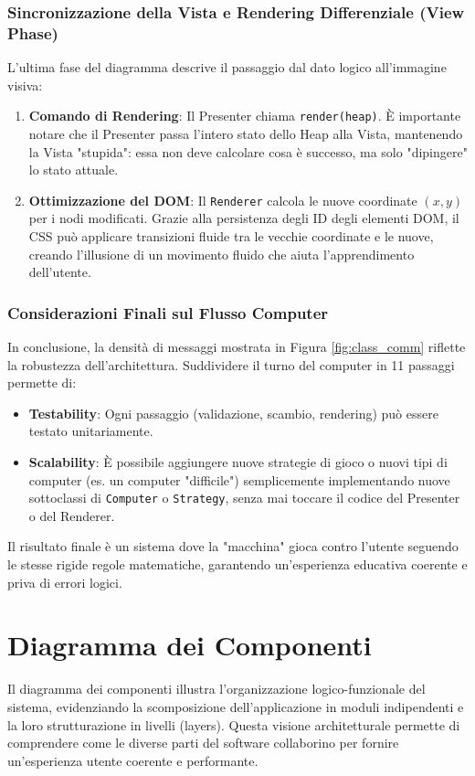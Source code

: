 \documentclass[openany]{theme/uniprthesis}
\begin{document}
\subsubsection{Sincronizzazione della Vista e Rendering Differenziale (View Phase)}
L'ultima fase del diagramma descrive il passaggio dal dato logico all'immagine visiva:
\begin{enumerate}
    \item \textbf{Comando di Rendering}: Il Presenter chiama \texttt{render(heap)}. È importante notare che il Presenter passa l'intero stato dello Heap alla Vista, mantenendo la Vista "stupida": essa non deve calcolare cosa è successo, ma solo "dipingere" lo stato attuale.
    \item \textbf{Ottimizzazione del DOM}: Il \texttt{Renderer} calcola le nuove coordinate $(x, y)$ per i nodi modificati. Grazie alla persistenza degli ID degli elementi DOM, il CSS può applicare transizioni fluide tra le vecchie coordinate e le nuove, creando l'illusione di un movimento fluido che aiuta l'apprendimento dell'utente.
\end{enumerate}

\subsubsection{Considerazioni Finali sul Flusso Computer}
In conclusione, la densità di messaggi mostrata in Figura \ref{fig:class_comm} riflette la robustezza dell'architettura. Suddividere il turno del computer in 11 passaggi permette di:
\begin{itemize}
    \item \textbf{Testability}: Ogni passaggio (validazione, scambio, rendering) può essere testato unitariamente.
    \item \textbf{Scalability}: È possibile aggiungere nuove strategie di gioco o nuovi tipi di computer (es. un computer "difficile") semplicemente implementando nuove sottoclassi di \texttt{Computer} o \texttt{Strategy}, senza mai toccare il codice del Presenter o del Renderer.
\end{itemize}
Il risultato finale è un sistema dove la "macchina" gioca contro l'utente seguendo le stesse rigide regole matematiche, garantendo un'esperienza educativa coerente e priva di errori logici.


\section{Diagramma dei Componenti}
Il diagramma dei componenti illustra l'organizzazione logico-funzionale del sistema, evidenziando la scomposizione dell'applicazione in moduli indipendenti e la loro strutturazione in livelli (layers). Questa visione architetturale permette di comprendere come le diverse parti del software collaborino per fornire un'esperienza utente coerente e performante.
\end{document}
